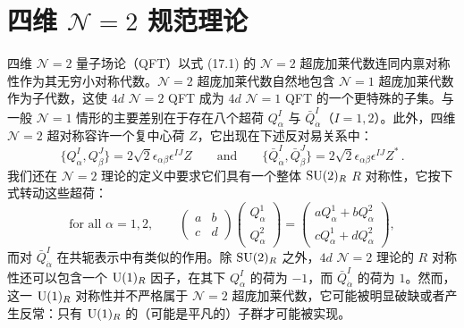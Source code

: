 
\chapter{四维 \texorpdfstring{$\mathcal N=2$}{N=2} 规范理论}


四维 $\mathcal N=2$ 量子场论（QFT）以式 (17.1) 的 $\mathcal N=2$ 超庞加莱代数连同内禀对称性作为其无穷小对称代数。$\mathcal N=2$ 超庞加莱代数自然地包含 $\mathcal N=1$ 超庞加莱代数作为子代数，这使 $4d$ $\mathcal N=2$ QFT 成为 $4d$ $\mathcal N=1$ QFT 的一个更特殊的子集。与一般 $\mathcal N=1$ 情形的主要差别在于存在八个超荷 $Q^I_\alpha$ 与 $\bar Q^I_{\dot\alpha}$（$I=1,2$）。此外，四维 $\mathcal N=2$ 超对称容许一个复中心荷 $Z$，它出现在下述反对易关系中：
\[
\{Q^I_\alpha,Q^J_\beta\}=2\sqrt{2}\epsilon_{\alpha\beta}\epsilon^{IJ}Z
\qquad\text{and}\qquad
\{\bar Q^I_{\dot\alpha},\bar Q^J_{\dot\beta}\}=2\sqrt{2}\epsilon_{\alpha\beta}\epsilon^{IJ}Z^*\,.
\]
我们还在 $\mathcal N=2$ 理论的定义中要求它们具有一个整体 $\operatorname{SU}(2)_R$ $R$ 对称性，它按下式转动这些超荷：
\[
\text{for all }\alpha=1,2,\qquad
\begin{pmatrix} a & b\\ c & d\end{pmatrix}
\begin{pmatrix} Q^1_\alpha\\ Q^2_\alpha\end{pmatrix}
=
\begin{pmatrix} aQ^1_\alpha+bQ^2_\alpha\\ cQ^1_\alpha+dQ^2_\alpha\end{pmatrix},
\]
而对 $\bar Q^I_{\dot\alpha}$ 在共轭表示中有类似的作用。除 $\operatorname{SU}(2)_R$ 之外，$4d$ $\mathcal N=2$ 理论的 $R$ 对称性还可以包含一个 $\operatorname{U}(1)_R$ 因子，在其下 $Q^I_\alpha$ 的荷为 $-1$，而 $\bar Q^I_{\dot\alpha}$ 的荷为 $1$。然而，这一 $\operatorname{U}(1)_R$ 对称性并不严格属于 $\mathcal N=2$ 超庞加莱代数，它可能被明显破缺或者产生反常：只有 $\operatorname{U}(1)_R$ 的（可能是平凡的）子群才可能被实现。


